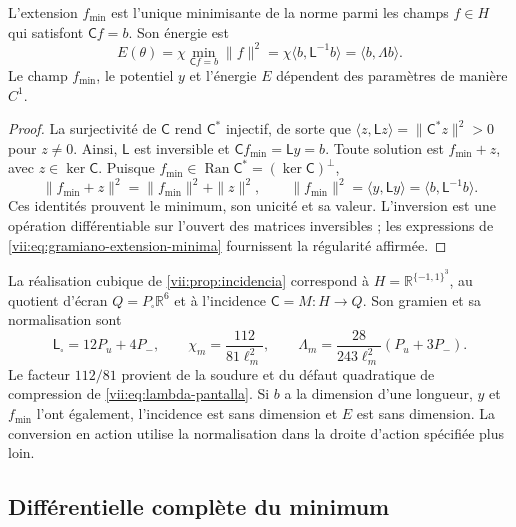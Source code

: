 \begin{proposition}
\label{vii:prop:minimo-parametrizado}
L'extension \(f_{\min}\) est l'unique minimisante de la norme parmi
les champs \(f\in H\) qui satisfont \(\mathsf C f=b\). Son énergie est
\begin{equation}
 E(\theta)=\chi\min_{\mathsf C f=b}\|f\|^2
 =\chi\langle b,\mathsf L^{-1}b\rangle
 =\langle b,\Lambda b\rangle.
 \label{vii:eq:energia-extension-minima}
\end{equation}
Le champ \(f_{\min}\), le potentiel \(y\) et l'énergie \(E\)
dépendent des paramètres de manière \(C^1\).
\end{proposition}

\begin{proof}
La surjectivité de \(\mathsf C\) rend \(\mathsf C^*\) injectif, de sorte que \(\langle z,\mathsf Lz\rangle=\|\mathsf C^*z\|^2>0\) pour \(z\ne0\). Ainsi, \(\mathsf L\) est inversible et \(\mathsf C f_{\min}=\mathsf L y=b\). Toute solution est \(f_{\min}+z\), avec \(z\in\ker\mathsf C\). Puisque \(f_{\min}\in\operatorname{Ran}\mathsf C^*=(\ker\mathsf C)^\perp\),
\[
 \|f_{\min}+z\|^2=\|f_{\min}\|^2+\|z\|^2,
 \qquad
 \|f_{\min}\|^2=\langle y,\mathsf L y\rangle
 =\langle b,\mathsf L^{-1}b\rangle.
\]
Ces identités prouvent le minimum, son unicité et sa valeur. L'inversion
est une opération différentiable sur l'ouvert des matrices inversibles ;
les expressions de \eqref{vii:eq:gramiano-extension-minima} fournissent
la régularité affirmée.
\end{proof}

La réalisation cubique de \ref{vii:prop:incidencia} correspond à
\(H=\mathbb R^{\{-1,1\}^3}\), au quotient d'écran
\(Q=P_\square\mathbb R^6\) et à l'incidence \(\mathsf C=M:H\to Q\).
Son gramien et sa normalisation sont
\begin{equation}
 \mathsf L_\square=12P_u+4P_-,\qquad
 \chi_m=\frac{112}{81\ell_m^2},\qquad
 \Lambda_m=\frac{28}{243\ell_m^2}(P_u+3P_-).
 \label{vii:eq:normalizacion-minimo-cubico}
\end{equation}
Le facteur \(112/81\) provient de la soudure et du défaut quadratique de compression de \eqref{vii:eq:lambda-pantalla}. Si \(b\) a la dimension d'une longueur, \(y\) et \(f_{\min}\) l'ont également, l'incidence est sans dimension et \(E\) est sans dimension. La conversion en action utilise la normalisation dans la droite d'action spécifiée plus loin.

\subsection{Différentielle complète du minimum}
\label{vii:subsec:diferencial-minimo}

